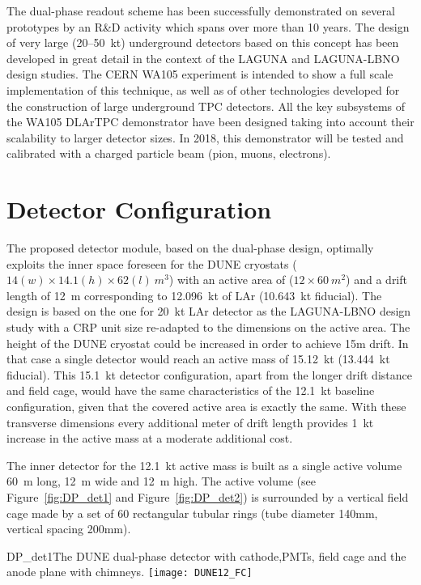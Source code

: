 The dual-phase readout scheme has been successfully demonstrated on
several prototypes by an R\&D activity which spans over more than 10
years.  The design of very large (20--50~kt) underground detectors
based on this concept has been developed in great detail in the
context of the LAGUNA and LAGUNA-LBNO design studies.  The CERN WA105
experiment is intended to show a full scale implementation of this
technique, as well as of other technologies developed for the
construction of large underground TPC detectors.  All the key
subsystems of the WA105 DLArTPC demonstrator have been designed
taking into account their scalability to larger detector sizes.  In
2018, this demonstrator will be tested and calibrated with a charged
particle beam (pion, muons, electrons).


\section{Detector Configuration}

The proposed detector module, based on the dual-phase design,
optimally exploits the inner space foreseen for the DUNE cryostats
($14 (w) \times 14.1 (h) \times 62 (l)~m^3$) with an active area of
($12 \times 60 ~m^2$) and a drift length of 12~m corresponding to
12.096~kt of LAr (10.643~kt fiducial). The design is based on the
one for 20~kt LAr detector as the LAGUNA-LBNO design study with a
CRP unit size re-adapted to the dimensions on the active area. The
height of the DUNE cryostat could be increased in order to achieve 15m
drift. In that case a single detector would reach an active mass of
15.12~kt (13.444~kt fiducial).  This 15.1~kt detector
configuration, apart from the longer drift distance and field cage,
would have the same characteristics of the 12.1~kt baseline
configuration, given that the covered active area is exactly the
same. With these transverse dimensions every additional meter of drift
length provides 1~kt increase in the active mass at a moderate
additional cost.

The inner detector for the 12.1~kt active mass is built as a single
active volume 60~m long, 12~m wide and 12~m high. The active volume (see
Figure~\ref{fig:DP_det1} and Figure~\ref{fig:DP_det2}) is surrounded
by a vertical field cage made by a set of 60 rectangular tubular rings
(tube diameter 140mm, vertical spacing 200mm).
\begin{cdrfigure}{DP_det1}{The DUNE dual-phase detector with cathode,PMTs, field cage and the anode plane with chimneys.}
\texttt{[image: DUNE12\_FC]}
\end{cdrfigure}

